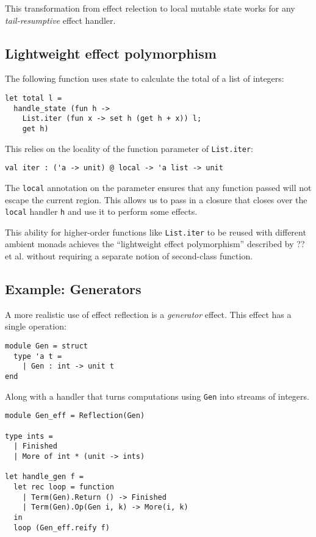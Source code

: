 \documentclass[acmsmall, screen, nonacm]{acmart}
\theoremstyle{definition}
\begin{document}
This transformation from effect relection to local mutable state works
for any \emph{tail-resumptive} effect handler.

\subsection{Lightweight effect polymorphism}

The following function uses state to calculate the total of a list of
integers:
\begin{lstlisting}[style=oxcaml]
let total l =
  handle_state (fun h ->
    List.iter (fun x -> set h (get h + x)) l;
    get h)
\end{lstlisting}
This relies on the locality of the function parameter of
\lstinline[style=oxcaml]{List.iter}:
\begin{lstlisting}[style=oxcaml]
val iter : ('a -> unit) @ local -> 'a list -> unit
\end{lstlisting}
The \lstinline[style=oxcaml]{local} annotation on the parameter ensures
that any function passed will not escape the current region. This allows
us to pass in a closure that closes over the
\lstinline[style=oxcaml]{local} handler \lstinline[style=oxcaml]{h} and
use it to perform some effects.

This ability for higher-order functions like
\lstinline[style=oxcaml]{List.iter} to be reused with different ambient
monads achieves the ``lightweight effect polymorphism'' described by ??
et al.\cite{??} without requiring a separate notion of second-class
function.

\subsection{Example: Generators}

A more realistic use of effect reflection is a \emph{generator}
effect. This effect has a single operation:
\begin{lstlisting}[style=oxcaml]
module Gen = struct
  type 'a t =
    | Gen : int -> unit t
end
\end{lstlisting}
Along with a handler that turns computations using
\lstinline[style=oxcaml]{Gen} into streams of integers.
\begin{lstlisting}[style=oxcaml]
module Gen_eff = Reflection(Gen)

type ints =
  | Finished
  | More of int * (unit -> ints)

let handle_gen f =
  let rec loop = function
    | Term(Gen).Return () -> Finished
    | Term(Gen).Op(Gen i, k) -> More(i, k)
  in
  loop (Gen_eff.reify f)
\end{lstlisting}
\end{document}
